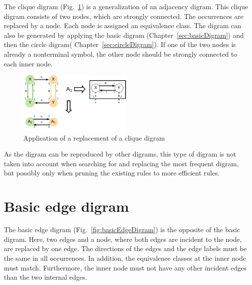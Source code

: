 The clique digram (Fig.~\ref{fig:cliqueDigram}) is a generalization of an adjacency digram.
This clique digram consists of two nodes, which are strongly connected. The occurrences are replaced by a node. Each node is assigned an equivalence class. The digram can also be generated by applying the basic digram (Chapter~\ref{sec:basicDigram}) and then the circle digram( Chapter~\ref{sec:circleDigram}).  If one of the two nodes is already a nonterminal symbol, the other node should be strongly connected to each inner node. 

\begin{figure}[h]
	\centering
	\includegraphics[width=0.5\textwidth]{chapters/imgConcept/cliqueDigram}
	\caption{Application of a replacement of a clique digram}
	\label{fig:cliqueDigram}
\end{figure}
As the digram can be reproduced by other digrams, this type of digram is not taken into account when searching for and replacing the most frequent digram, but possibly only when pruning the existing rules to more efficient rules.



\section{Basic edge digram}
\label{sec:basicEdgeDigram}


The basic edge digram (Fig.~\ref{fig:basicEdgeDigram}) is the opposite of the basic digram.
Here, two edges and a node, where both edges are incident to the node, are replaced by one edge. The directions of the edges and the edge labels must be the same in all occurrences. In addition, the equivalence classes at the inner node must match. Furthermore, the inner node must not have any other incident edges than the two internal edges. 

